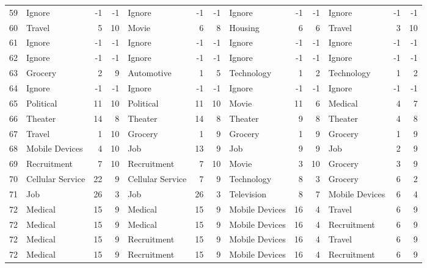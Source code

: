 \begin{figure}[htbp]
\begin{tabular}{rlrrlrrlrrlrr}
    59    & Ignore & -1    & -1    & Ignore & -1    & -1    & Ignore & -1    & -1    & Ignore & -1    & -1 \\
    60    & Travel & 5     & 10    & Movie & 6     & 8     & Housing & 6     & 6     & Travel & 3     & 10 \\
    61    & Ignore & -1    & -1    & Ignore & -1    & -1    & Ignore & -1    & -1    & Ignore & -1    & -1 \\
    62    & Ignore & -1    & -1    & Ignore & -1    & -1    & Ignore & -1    & -1    & Ignore & -1    & -1 \\
    63    & Grocery & 2     & 9     & Automotive & 1     & 5     & Technology & 1     & 2     & Technology & 1     & 2 \\
    64    & Ignore & -1    & -1    & Ignore & -1    & -1    & Ignore & -1    & -1    & Ignore & -1    & -1 \\
    65    & Political & 11    & 10    & Political & 11    & 10    & Movie & 11    & 6     & Medical & 4     & 7 \\
    66    & Theater & 14    & 8     & Theater & 14    & 8     & Theater & 9     & 8     & Theater & 4     & 8 \\
    67    & Travel & 1     & 10    & Grocery & 1     & 9     & Grocery & 1     & 9     & Grocery & 1     & 9 \\
    68    & Mobile Devices & 4     & 10    & Job   & 13    & 9     & Job   & 9     & 9     & Job   & 2     & 9 \\
    69    & Recruitment & 7     & 10    & Recruitment & 7     & 10    & Movie & 3     & 10    & Grocery & 3     & 9 \\
    70    & Cellular Service & 22    & 9     & Cellular Service & 7     & 9     & Technology & 8     & 3     & Grocery & 6     & 2 \\
    71    & Job   & 26    & 3     & Job   & 26    & 3     & Television & 8     & 7     & Mobile Devices & 6     & 4 \\
    72    & Medical & 15    & 9     & Medical & 15    & 9     & Mobile Devices & 16    & 4     & Travel & 6     & 9 \\
    72    & Medical & 15    & 9     & Medical & 15    & 9     & Mobile Devices & 16    & 4     & Recruitment & 6     & 9 \\
    72    & Medical & 15    & 9     & Recruitment & 15    & 9     & Mobile Devices & 16    & 4     & Travel & 6     & 9 \\
    72    & Medical & 15    & 9     & Recruitment & 15    & 9     & Mobile Devices & 16    & 4     & Recruitment & 6     & 9 \\

\end{tabular}
\end{figure}
